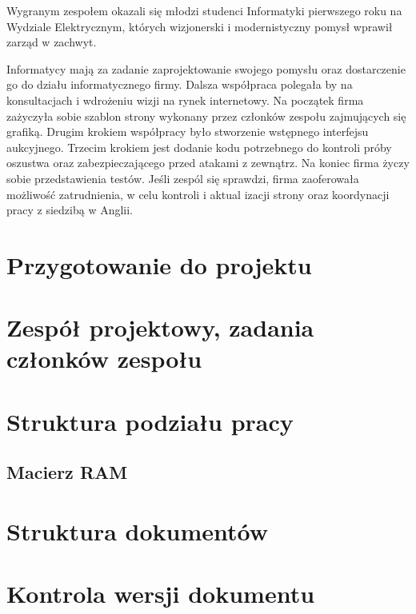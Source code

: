 \documentclass[10pt,a4paper]{article}
\begin{document}
Wygranym zespołem okazali się młodzi studenci Informatyki pierwszego roku na
Wydziale Elektrycznym, których wizjonerski i modernistyczny pomysł wprawił
zarząd w zachwyt.

Informatycy mają za zadanie zaprojektowanie swojego pomysłu oraz dostarczenie
go do działu informatycznego firmy. Dalsza współpraca polegała by na
konsultacjach i wdrożeniu wizji na rynek internetowy. Na początek firma
zażyczyła sobie szablon strony wykonany przez członków zespołu zajmujących się
grafiką. Drugim krokiem współpracy było stworzenie wstępnego interfejsu
aukcyjnego. Trzecim krokiem jest dodanie kodu potrzebnego do kontroli próby
oszustwa oraz zabezpieczającego przed atakami z zewnątrz. Na koniec firma życzy
sobie przedstawienia testów. Jeśli zespól się sprawdzi, firma zaoferowała
możliwość zatrudnienia, w celu kontroli i aktual izacji strony oraz koordynacji
pracy z siedzibą w Anglii.

\section{Przygotowanie do projektu}

\section{Zespół projektowy, zadania członków zespołu}

\section{Struktura podziału pracy}
\subsection{Macierz RAM}

\section{Struktura dokumentów}

\section{Kontrola wersji dokumentu}
\end{document}
